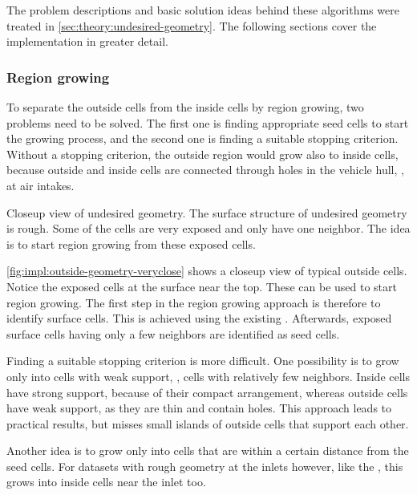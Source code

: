 The problem descriptions and basic solution ideas behind these algorithms were treated in \autoref{sec:theory:undesired-geometry}. The following sections cover the implementation in greater detail.

\subsubsection{Region growing}
\label{sec:impl:region-growing}

To separate the outside cells from the inside cells by region growing, two problems need to be solved. The first one is finding appropriate seed cells to start the growing process, and the second one is finding a suitable stopping criterion. Without a stopping criterion, the outside region would grow also to inside cells, because outside and inside cells are connected through holes in the vehicle hull, \eg, at air intakes.

{Closeup view of undesired geometry. The surface structure of undesired geometry is rough. Some of the cells are very exposed and only have one neighbor. The idea is to start region growing from these exposed cells.}

\autoref{fig:impl:outside-geometry-veryclose} shows a closeup view of typical outside cells. Notice the exposed cells at the surface near the top. These can be used to start region growing.
The first step in the region growing approach is therefore to identify surface cells. This is achieved using the existing . Afterwards, exposed surface cells having only a few neighbors %
are identified as seed cells.

Finding a suitable stopping criterion is more difficult. One possibility is to grow only into cells with weak support, \ie, cells with relatively few neighbors. Inside cells have strong support, because of their compact arrangement, whereas outside cells have weak support, as they are thin and contain holes.
This approach leads to practical results, but misses small islands of outside cells that support each other.

Another idea is to grow only into cells that are within a certain distance from the seed cells. %
For datasets with rough geometry at the inlets however, like the \toyotadataset, this grows into inside cells near the inlet too.

